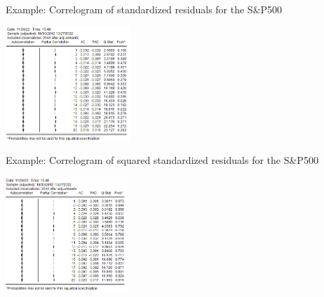\begin{frame}%

\begin{block}{Example: Correlogram of standardized residuals for the S\&P500}
\centerline{\includegraphics[height=1.7in]{corr_resids}}
\end{block}

\end{frame}%

\begin{frame}%

\begin{block}{Example: Correlogram of squared standardized residuals for the S\&P500}
\centerline{\includegraphics[height=1.7in]{corr_resids_sq}}
\end{block}

\end{frame}%

